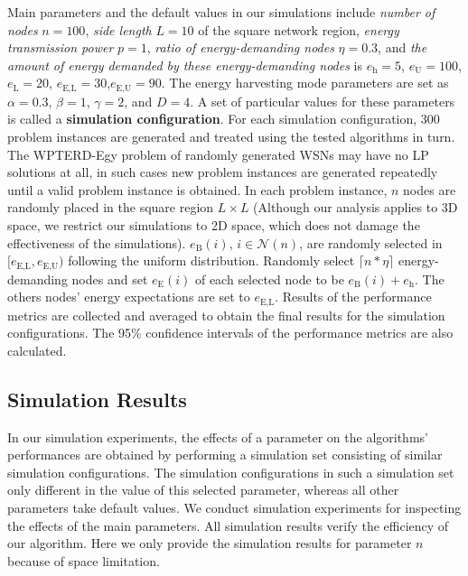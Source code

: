 \documentclass[journal,10pt]{IEEEtran}
\begin{document}
Main parameters and the default values in our simulations include \textit{number of nodes} $n{=}100$, \textit{side length} $L{=}10$ of the square network region, \textit{energy transmission power} $p{=}1$, \textit{ratio of energy-demanding nodes} $\eta{=}0.3$, and \textit{the amount of energy demanded by these energy-demanding nodes} is $e_\text{h}{=}5$, $e_\text{U}{=}100$, $e_\text{L}{=}20$, $e_\text{E,L}{=}30$,$e_\text{E,U}{=}90$. The energy harvesting mode parameters are set as $\alpha{=}0.3$, $\beta{=}1$, $\gamma{=}2$, and $D{=}4$. A set of particular values for these parameters is called a \textbf{simulation configuration}. For each simulation configuration, 300 problem instances are generated and treated using the tested algorithms in turn. The WPTERD-Egy problem of randomly generated WSNs may have no LP solutions at all, in such cases new problem instances are generated repeatedly until a valid problem instance is obtained. In each problem instance, $n$ nodes are randomly placed in the square region $L{\times}L$ (Although our analysis applies to 3D space, we restrict our simulations to 2D space, which does not damage the effectiveness of the simulations). $e_\text{B}(i)$, $i{\in}\mathcal{N}(n)$, are randomly selected in $[e_\text{E,L},e_\text{E,U})$ following the uniform distribution. Randomly select ${\lceil}n{*}\eta{\rceil}$ energy-demanding nodes and set $e_\text{E}(i)$ of each selected node to be $e_\text{B}(i){+}e_\text{h}$. The others nodes' energy expectations are set to $e_\text{E,L}$. Results of the performance metrics are collected and averaged to obtain the final results for the simulation configurations. The 95\% confidence intervals of the performance metrics are also calculated.

\subsection{Simulation Results}

In our simulation experiments, the effects of a parameter on the algorithms' performances are obtained by performing a simulation set consisting of similar simulation configurations. The simulation configurations in such a simulation set only different in the value of this selected parameter, whereas all other parameters take default values. We conduct simulation experiments for inspecting the effects of the main parameters. All simulation results verify the efficiency of our algorithm. Here we only provide the simulation results for parameter $n$ because of space limitation.
\end{document}
